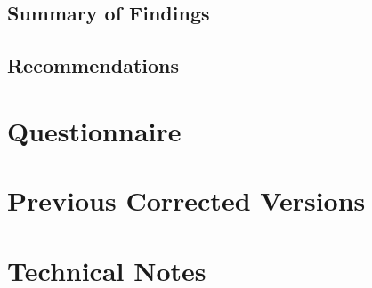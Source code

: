 \documentclass[12pt]{report}
\begin{document}
\section{Summary of Findings}
\section{Recommendations}

\lipsum

\printbibliography[heading=bibnumbered]


\appendix
\chapter{Questionnaire}
\lipsum
\chapter{Previous Corrected Versions}
\lipsum
\chapter{Technical Notes}
\lipsum

\end{document}
